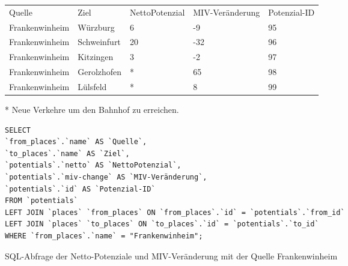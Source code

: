 \begin{tabularx}{\textwidth}{*5{X}}
Quelle & Ziel & NettoPotenzial & MIV-Veränderung & Potenzial-ID\\ 
Frankenwinheim & Würzburg & 6 & -9 & 95\\ 
Frankenwinheim & Schweinfurt & 20 & -32 & 96\\ 
Frankenwinheim & Kitzingen & 3 & -2 & 97\\ 
Frankenwinheim & Gerolzhofen & * & 65 & 98\\ 
Frankenwinheim & Lülsfeld & * & 8 & 99\\ 
\end{tabularx}    
\newline
\newline
* Neue Verkehre um den Bahnhof zu erreichen.
\newline
\begin{listing}[htbp]
\begin{verbatim}
SELECT
`from_places`.`name` AS `Quelle`, 
`to_places`.`name` AS `Ziel`, 
`potentials`.`netto` AS `NettoPotenzial`, 
`potentials`.`miv-change` AS `MIV-Veränderung`, 
`potentials`.`id` AS `Potenzial-ID`
FROM `potentials`
LEFT JOIN `places` `from_places` ON `from_places`.`id` = `potentials`.`from_id`
LEFT JOIN `places` `to_places` ON `to_places`.`id` = `potentials`.`to_id`
WHERE `from_places`.`name` = "Frankenwinheim";
\end{verbatim}
\caption{SQL-Abfrage der Netto-Potenziale und MIV-Veränderung mit der Quelle Frankenwinheim}\label{lst-fz-frankenwinheim}
\end{listing}